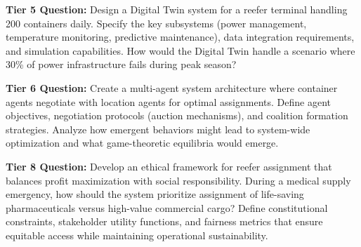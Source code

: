 \documentclass{article}
\begin{document}
\textbf{Tier 5 Question:} Design a Digital Twin system for a reefer terminal handling 200 containers daily. Specify the key subsystems (power management, temperature monitoring, predictive maintenance), data integration requirements, and simulation capabilities. How would the Digital Twin handle a scenario where 30\% of power infrastructure fails during peak season?

\textbf{Tier 6 Question:} Create a multi-agent system architecture where container agents negotiate with location agents for optimal assignments. Define agent objectives, negotiation protocols (auction mechanisms), and coalition formation strategies. Analyze how emergent behaviors might lead to system-wide optimization and what game-theoretic equilibria would emerge.

\textbf{Tier 8 Question:} Develop an ethical framework for reefer assignment that balances profit maximization with social responsibility. During a medical supply emergency, how should the system prioritize assignment of life-saving pharmaceuticals versus high-value commercial cargo? Define constitutional constraints, stakeholder utility functions, and fairness metrics that ensure equitable access while maintaining operational sustainability.
\end{document}
